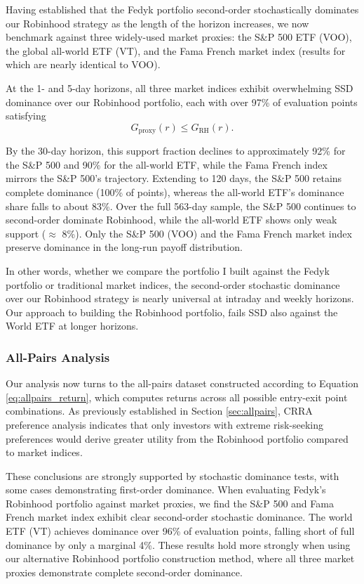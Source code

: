 Having established that the Fedyk portfolio second-order stochastically dominates our Robinhood strategy as the length of the horizon increases, 
we now benchmark against three widely-used market proxies: the S\&P 500 ETF (VOO), the global all-world ETF (VT), and the Fama French market index (results for which are nearly identical to VOO).

At the 1- and 5-day horizons, all three market indices exhibit overwhelming SSD dominance over our Robinhood portfolio, each with over 97\% of evaluation points satisfying
\begin{equation}
    G_{\mathrm{proxy}}(r) \leq G_{\mathrm{RH}}(r).
\end{equation}

By the 30-day horizon, this support fraction declines to approximately 92\% for the S\&P 500 and 90\% for the all-world ETF, while the Fama French index mirrors the S\&P 500's trajectory. 
Extending to 120 days, the S\&P 500 retains complete dominance (100\% of points), whereas the all-world ETF's dominance share falls to about 83\%. 
Over the full 563-day sample, the S\&P 500 continues to second-order dominate Robinhood, while the all-world ETF shows only weak support ($\approx$ 8\%).
Only the S\&P 500 (VOO) and the Fama French market index preserve dominance in the long-run payoff distribution.

In other words, whether we compare the portfolio I built against the Fedyk portfolio or traditional market indices, the second-order stochastic dominance over our Robinhood strategy is nearly universal at intraday and weekly horizons. 
Our approach to building the Robinhood portfolio, fails SSD also against the World ETF at longer horizons.

\subsubsection{All-Pairs Analysis}
Our analysis now turns to the all-pairs dataset constructed according to Equation \ref{eq:allpairs_return}, which computes returns across all possible entry-exit point combinations. 
As previously established in Section \ref{sec:allpairs}, CRRA preference analysis indicates that only investors with extreme risk-seeking preferences would derive greater utility from the Robinhood portfolio compared to market indices.

These conclusions are strongly supported by stochastic dominance tests, with some cases demonstrating first-order dominance. 
When evaluating Fedyk's Robinhood portfolio against market proxies, we find the S\&P 500 and Fama French market index exhibit clear second-order stochastic dominance. 
The world ETF (VT) achieves dominance over 96\% of evaluation points, falling short of full dominance by only a marginal 4\%. 
These results hold more strongly when using our alternative Robinhood portfolio construction method, where all three market proxies demonstrate complete second-order dominance.


